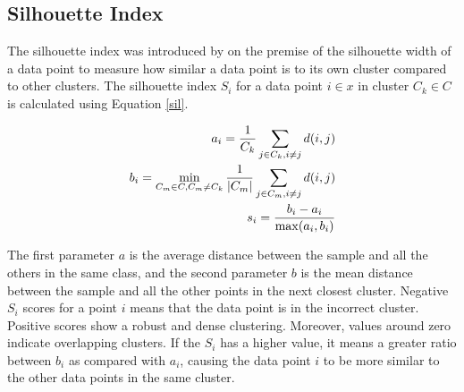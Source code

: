 \subsection{Silhouette Index}

 The silhouette index was introduced by \cite{rousseeuw1987silhouettes} on the premise of the  silhouette  width  of  a  data  point to measure how similar a data point is to its own cluster compared to other clusters. The silhouette index $S_i$ for a data point $i\in x$ in cluster $C_k\in C$ is calculated using Equation \ref{sil}.
 
 
 \begin{align}
    a_i = \frac{1}{C_k} \sum_{j \in C_k,i\neq j } d(i,j) \\
    b_i = \min_{C_m \in C, C_m\neq C_k} \frac{1}{\abs{C_m}} \sum_{j \in C_m,i\neq j} d(i,j) \\
    s_i =  \frac{b_i - a_i}{\max(a_i,b_i)}  \label{sil}
\end{align}

The first parameter $a$ is the average distance between the sample and all the others in the same class, and the second parameter $b$ is the mean distance between the sample and all the other points in the next closest cluster. Negative $S_i$ scores for a point $i$ means that the data point is in the incorrect cluster. Positive scores show a robust and dense clustering. Moreover, values around zero indicate overlapping clusters. If the $S_i$ has a higher value, it means a greater ratio between $b_i$ as compared with $a_i$, causing the data point $i$ to be more similar to the other data points in the same cluster.  



    

